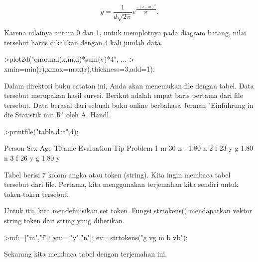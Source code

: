 \documentclass[12pt,arial,letterpaper]{book}
\begin{document}
\begin{eulernootebook}
\begin{eulercomment}
\begin{eulercomment}
\begin{eulernootebook}
\begin{eulercomment}
\begin{eulercomment}
\begin{eulercomment}
\begin{eulercomment}
\begin{eulercomment}
\begin{eulercomment}
\begin{eulercomment}
\begin{eulercomment}
\end{eulercomment}
\begin{eulerformula}
\[
y=\frac{1}{d\sqrt{2\pi}}e^{\frac{-(x-m)^2}{2d^2}}.
\]
\end{eulerformula}
\begin{eulercomment}
Karena nilainya antara 0 dan 1, untuk memplotnya pada diagram batang,
nilai tersebut harus dikalikan dengan 4 kali jumlah data.
\end{eulercomment}
\begin{eulerprompt}
>plot2d("qnormal(x,m,d)*sum(v)*4", ...
>  xmin=min(r),xmax=max(r),thickness=3,add=1):
\end{eulerprompt}
\begin{eulercomment}
Dalam direktori buku catatan ini, Anda akan menemukan file dengan
tabel. Data tersebut merupakan hasil survei. Berikut adalah empat
baris pertama dari file tersebut. Data berasal dari sebuah buku online
berbahasa Jerman "Einführung in die Statistik mit R" oleh A. Handl.
\end{eulercomment}
\begin{eulerprompt}
>printfile("table.dat",4);
\end{eulerprompt}
\begin{euleroutput}
  Person Sex Age Titanic Evaluation Tip Problem
  1 m 30 n . 1.80 n
  2 f 23 y g 1.80 n
  3 f 26 y g 1.80 y
\end{euleroutput}
\begin{eulercomment}
Tabel berisi 7 kolom angka atau token (string). Kita ingin membaca
tabel tersebut dari file. Pertama, kita menggunakan terjemahan kita
sendiri untuk token-token tersebut.

Untuk itu, kita mendefinisikan set token. Fungsi strtokens()
mendapatkan vektor string token dari string yang diberikan.
\end{eulercomment}
\begin{eulerprompt}
>mf:=["m","f"]; yn:=["y","n"]; ev:=strtokens("g vg m b vb");
\end{eulerprompt}
\begin{eulercomment}
Sekarang kita membaca tabel dengan terjemahan ini.


\end{eulercomment}
\end{eulercomment}
\end{eulercomment}
\end{eulercomment}
\end{eulercomment}
\end{eulercomment}
\end{eulercomment}
\end{eulercomment}
\end{eulernootebook}
\end{eulercomment}
\end{eulercomment}
\end{eulernootebook}
\end{document}
